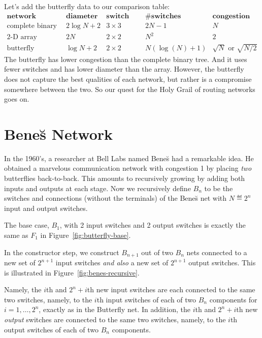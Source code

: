 Let's add the butterfly data to our comparison table:
%
\[
\begin{array}{r|c|c|c|c}
\textbf{network} &
\textbf{diameter} &
\textbf{switch size} &
\textbf{\# switches} &
\textbf{congestion} \\ \hline
\text{complete binary tree} & 2 \log N + 2 & 3 \times 3 & 2N - 1 & N \\
\text{2-D array} & 2 N & 2 \times 2 & N^2 & 2 \\
\text{butterfly} & \log N + 2 & 2 \times 2 & N (\log(N) + 1) & \sqrt{N} \text{ or } \sqrt{N/2}
\end{array}
\]
%
The butterfly has lower congestion than the complete binary tree.  And
it uses fewer switches and has lower diameter than the array.
However, the butterfly does not capture the best qualities of each
network, but rather is a compromise somewhere between the two.  So our
quest for the Holy Grail of routing networks goes on.

\section{Bene\u{s} Network}

In the 1960's, a researcher at Bell Labs named Bene\u{s} had a
remarkable idea.  He obtained a marvelous communication network with
congestion 1 by placing \textit{two} butterflies back-to-back.  This
amounts to recursively growing  by adding both inputs
and outputs at each stage.  Now we recursively define $B_n$ to be the
switches and connections (without the terminals) of the Bene\u{s} net
with $N \eqdef 2^n$ input and output switches.

The base case, $B_1$, with 2 input switches and 2 output switches is
exactly the same as $F_1$ in Figure~\ref{fig:butterfly-base}.

In the constructor step, we construct $B_{n+1}$ out of two $B_n$ nets
connected to a new set of $2^{n+1}$ input switches \emph{and also} a
new set of $2^{n+1}$ output switches.  This is illustrated in
Figure~\ref{fig:benes-recursive}.

Namely, the $i$th and $2^n+i$th new input switches are each connected to
the same two switches, namely, to the $i$th input switches of each of two
$B_n$ components for $i=1,\dots,2^n$, exactly as in the Butterfly net.  In
addition, the $i$th and $2^n+i$th new \emph{output} switches are connected
to the same two switches, namely, to the $i$th output switches of each of
two $B_n$ components.

